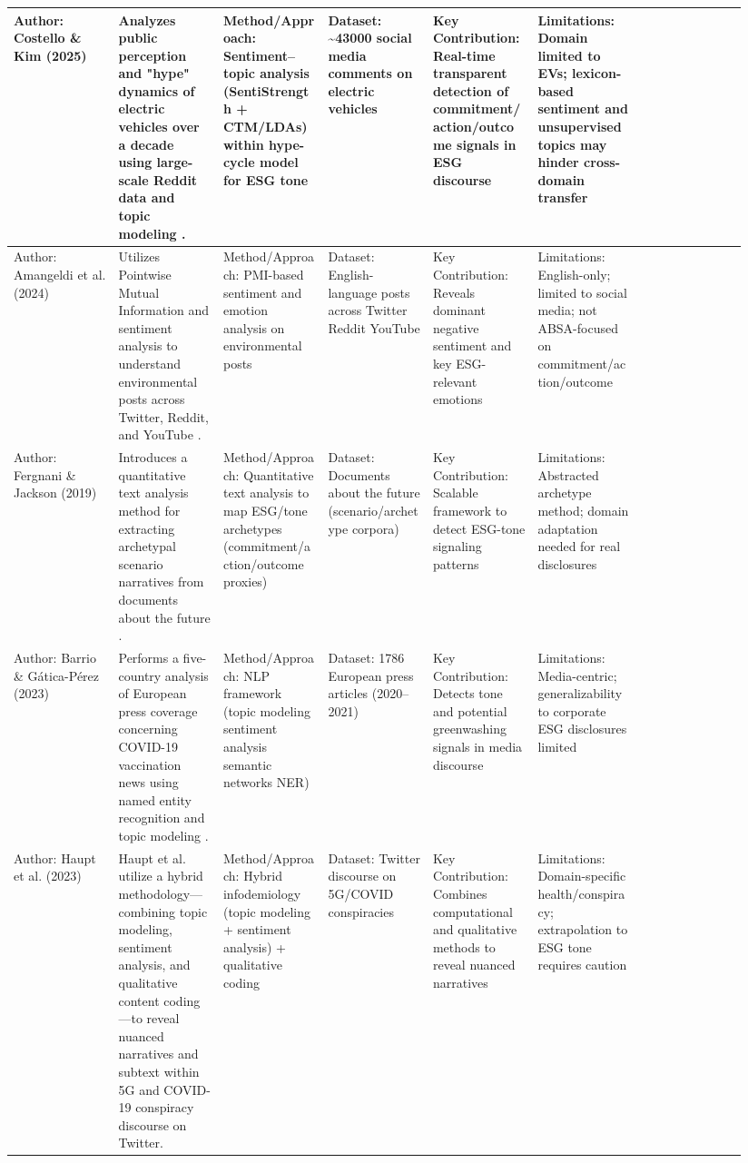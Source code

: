 \documentclass{article}
\begin{document}
\begin{landscape}
\begin{longtable}{p{0.134\linewidth} p{0.134\linewidth} p{0.134\linewidth} p{0.134\linewidth} p{0.134\linewidth} p{0.134\linewidth} p{0.134\linewidth}}
Author: Costello \& Kim (2025) & Analyzes public perception and "hype" dynamics of electric vehicles over a decade using large-scale Reddit data and topic modeling  \parencite{tao_ruan_824a9480}. & Method/Approach: Sentiment–topic analysis (SentiStrength + CTM/LDAs) within hype-cycle model for ESG tone & Dataset: \textasciitilde{}43000 social media comments on electric vehicles & Key Contribution: Real-time transparent detection of commitment/action/outcome signals in ESG discourse & Limitations: Domain limited to EVs; lexicon-based sentiment and unsupervised topics may hinder cross-domain transfer & ~ \\ \hline
Author: Amangeldi et al. (2024) & Utilizes Pointwise Mutual Information and sentiment analysis to understand environmental posts across Twitter, Reddit, and YouTube  \parencite{daniyar_amangeldi_dfc2f315}. & Method/Approach: PMI-based sentiment and emotion analysis on environmental posts & Dataset: English-language posts across Twitter Reddit YouTube & Key Contribution: Reveals dominant negative sentiment and key ESG-relevant emotions & Limitations: English-only; limited to social media; not ABSA-focused on commitment/action/outcome & ~ \\ \hline
Author: Fergnani \& Jackson (2019) & Introduces a quantitative text analysis method for extracting archetypal scenario narratives from documents about the future  \parencite{alessandro_fergnani_2dcaa903}. & Method/Approach: Quantitative text analysis to map ESG/tone archetypes (commitment/action/outcome proxies) & Dataset: Documents about the future (scenario/archetype corpora) & Key Contribution: Scalable framework to detect ESG-tone signaling patterns & Limitations: Abstracted archetype method; domain adaptation needed for real disclosures & ~ \\ \hline
Author: Barrio \& Gática-Pérez (2023) & Performs a five-country analysis of European press coverage concerning COVID-19 vaccination news using named entity recognition and topic modeling  \parencite{david_alonso_del_barrio_725eba22}. & Method/Approach: NLP framework (topic modeling sentiment analysis semantic networks NER) & Dataset: 1786 European press articles (2020–2021) & Key Contribution: Detects tone and potential greenwashing signals in media discourse & Limitations: Media-centric; generalizability to corporate ESG disclosures limited & ~ \\ \hline
Author: Haupt et al. (2023) & Haupt et al.  \parencite{michael_robert_haupt_ccbbb1b9} utilize a hybrid methodology—combining topic modeling, sentiment analysis, and qualitative content coding—to reveal nuanced narratives and subtext within 5G and COVID-19 conspiracy discourse on Twitter. & Method/Approach: Hybrid infodemiology (topic modeling + sentiment analysis) + qualitative coding & Dataset: Twitter discourse on 5G/COVID conspiracies & Key Contribution: Combines computational and qualitative methods to reveal nuanced narratives & Limitations: Domain-specific health/conspiracy; extrapolation to ESG tone requires caution & ~ \\ \hline

\end{longtable}
\end{landscape}
\end{document}
